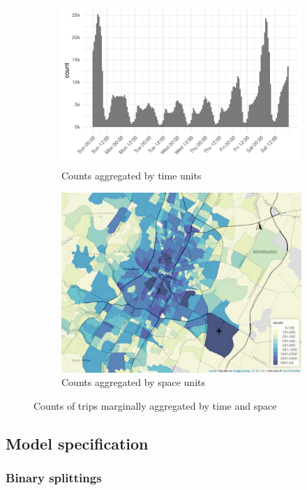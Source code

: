 \documentclass[11pt]{article}
\begin{document}
\begin{figure}[htb]
    \centering
    \begin{subfigure}[a]{.95\linewidth}
        \centering
        \includegraphics[width=0.7\linewidth]{img/prodhist_timely.pdf}
        \caption{Counts aggregated by time units}
        \label{fig:prod:timely}
    \end{subfigure}%
    \hfill
    \begin{subfigure}[b]{.95\linewidth}
        \centering
        \includegraphics[width=0.7\linewidth]{img/prodhist_spatial.pdf}
        \caption{Counts aggregated by space units}
        \label{fig:prod:spatial}
    \end{subfigure}%
    \caption{Counts of trips marginally aggregated by time and space} 
    \label{fig:prod_spacetime}
\end{figure}

\subsection{Model specification}

\subsubsection{Binary splittings}
\end{document}
